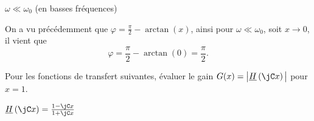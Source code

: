 \begin{enonce}
	$\omega \ll \omega_0$ (en basses fréquences)
\end{enonce}


\begin{corrigeNewpage}
	On a vu précédemment que $\varphi=\frac{\pi}{2} -\arctan(x)$, ainsi pour $\omega \ll \omega_0$, soit $x \rightarrow 0$, il vient que
\[
	\varphi = \frac{\pi}{2} -\arctan(0) = \frac{\pi}{2}.
\]
\end{corrigeNewpage}

\finEntrainement








\hauteurLargeurCadreReponse		{6mm}{8cm}
\initialisationEntrainement

Pour les fonctions de transfert suivantes, évaluer le gain $G(x) = \big| \underline{H}\left(\jC x \right) \big|$ pour $x = 1$.

\debutEntrainement



\begin{enonce}
	$\underline{H}\left(\jC x \right)=\frac{1-\jC x}{1+\jC x}$
\end{enonce}

